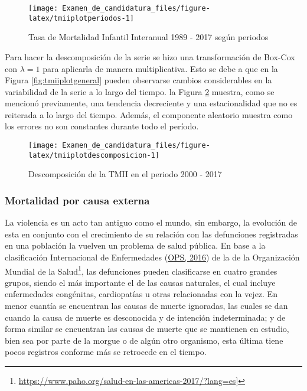 \documentclass[
]{article}
\begin{document}
\begin{figure}[H]
\texttt{[image: Examen\_de\_candidatura\_files/figure-latex/tmiiplotperiodos-1]} \caption{Tasa de Mortalidad Infantil Interanual 1989 - 2017 según periodos}\label{fig:tmiiplotperiodos}
\end{figure}

Para hacer la descomposición de la serie se hizo una transformación de
Box-Cox con \(\lambda=1\) para aplicarla de manera multiplicativa. Esto
se debe a que en la Figura \ref{fig:tmiiplotgeneral} pueden observarse
cambios considerables en la variabilidad de la serie a lo largo del
tiempo. la Figura \ref{fig:tmiiplotdescomposicion} muestra, como se
mencionó previamente, una tendencia decreciente y una estacionalidad que
no es reiterada a lo largo del tiempo. Además, el componente aleatorio
muestra como los errores no son constantes durante todo el período.

\begin{figure}[H]
\texttt{[image: Examen\_de\_candidatura\_files/figure-latex/tmiiplotdescomposicion-1]} \caption{Descomposición de la TMII en el periodo 2000 - 2017}\label{fig:tmiiplotdescomposicion}
\end{figure}

\subsubsection{Mortalidad por causa externa}

La violencia es un acto tan antiguo como el mundo, sin embargo, la
evolución de esta en conjunto con el crecimiento de su relación con las
defunciones registradas en una población la vuelven un problema de salud
pública. En base a la clasificación Internacional de Enfermedades
(\protect\hyperlink{ref-CIE10}{OPS, 2016}) de la de la Organización
Mundial de la Salud\footnote{\url{https://www.paho.org/salud-en-las-americas-2017/?lang=es}{]}},
las defunciones pueden clasificarse en cuatro grandes grupos, siendo el
más importante el de las causas naturales, el cual incluye enfermedades
congénitas, cardiopatías u otras relacionadas con la vejez. En menor
cuantía se encuentran las causas de muerte ignoradas, las cuales se dan
cuando la causa de muerte es desconocida y de intención indeterminada; y
de forma similar se encuentran las causas de muerte que se mantienen en
estudio, bien sea por parte de la morgue o de algún otro organismo, esta
última tiene pocos registros conforme más se retrocede en el tiempo.
\end{document}
